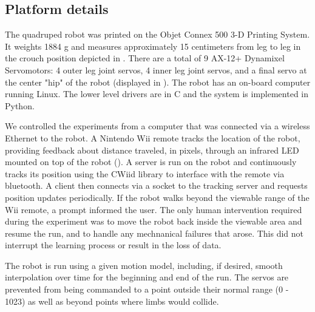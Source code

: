 \subsection{Platform details}













The quadruped robot was printed on the Objet
Connex 500 3-D Printing System. It weights 1884 g and measures approximately
15 centimeters from leg to leg in the crouch position depicted in
. There are a total of 9 AX-12+ Dynamixel
Servomotors: 4 outer leg joint
servos, 4 inner leg joint servos, and a final servo at the center "hip" of the
robot (displayed in ). The robot has an on-board computer running Linux. 
The lower level drivers are in C and the system is implemented in Python. 


We controlled the experiments from a computer that was connected via a
wireless Ethernet to the robot. A Nintendo Wii remote tracks the location 
of the robot, providing feedback
about distance traveled, in pixels, through an infrared LED mounted on top of 
the robot (). A server is run on the robot and continuously tracks its
position using the CWiid library\cite{cwiid} to interface with the remote
via bluetooth. A client then connects via a socket to the tracking
server and requests position updates periodically. If the robot walks 
beyond the viewable range of the Wii remote, a prompt informed the
user. The only human intervention required during the
experiment was to move the robot back inside the viewable area and resume
the run, and to handle any mechnanical failures that arose. This did not
interrupt the learning process or result in the loss of data.

The robot is run using a given motion model, including, if desired, 
smooth interpolation over time for the beginning and end of the run. 
The servos are prevented from being commanded to a point outside their
normal range (0 - 1023) as well as beyond points where limbs would collide.
